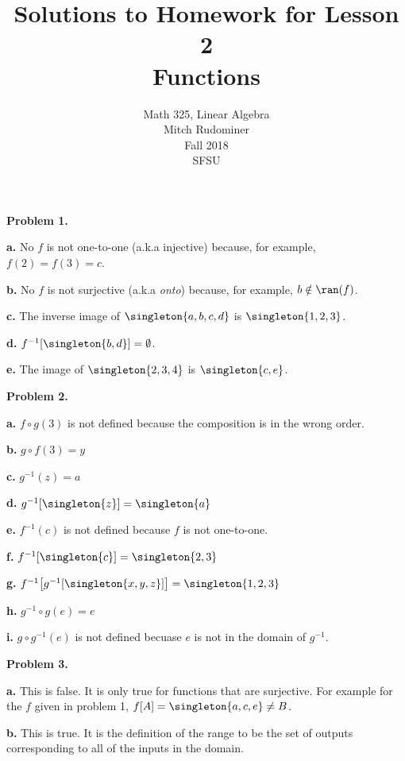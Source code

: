 \documentclass[oneside,12pt]{amsart}
\begin{document}
\title{Solutions to Homework for Lesson 2 \\ Functions}
\author{Math 325, Linear Algebra \\ Mitch Rudominer \\ Fall 2018 \\ SFSU }
\date{}

\maketitle


\textbf{Problem 1.}

\textbf{a.} No $f$ is not one-to-one (a.k.a injective) because, for example,
$f(2) = f(3) = c$.

\textbf{b.} No $f$ is not surjective (a.k.a \emph{onto}) because, for example,
$b\notin\ran(f)$.

\textbf{c.} The inverse image of $\singleton{a,b,c,d}$ is $\singleton{1,2,3}$.

\textbf{d.} $f^{-1}[\singleton{b, d}] = \emptyset$.


\textbf{e.} The image of $\singleton{2,3,4}$ is $\singleton{c, e}$.

\medskip

\textbf{Problem 2.}

\textbf{a.} $f\circ g (3)$ is not defined because the composition is in the wrong order.

\textbf{b.} $g\circ f (3) = y$


\textbf{c.} $g^{-1}(z) = a$


\textbf{d.} $g^{-1}[\singleton{z}] = \singleton{a}$


\textbf{e.} $f^{-1}(c)$ is not defined because $f$ is not one-to-one.


\textbf{f.} $f^{-1}[\singleton{c}] = \singleton{2,3}$


\textbf{g.} $f^{-1}\big[g^{-1}[\singleton{x, y, z}]\big] = \singleton{1,2,3}$


\textbf{h.} $g^{-1} \circ g (e) = e$

\textbf{i.} $g \circ g^{-1} (e)$ is not defined becuase $e$ is not in the domain of $g^{-1}$.

\medskip

\textbf{Problem 3.}

\textbf{a.} This is false. It is only true for functions that are surjective.
For example for the $f$ given in problem 1,  $f[A] = \singleton{a,c,e} \not= B$.

\textbf{b.} This is true. It is the definition of the range to be the set of
outputs corresponding to all of the inputs in the domain.
\end{document}
